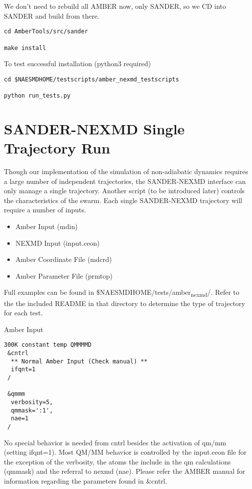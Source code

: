 \documentclass[11pt]{article}
\begin{document}
We don’t need to rebuild all AMBER now, only SANDER, so we CD into SANDER and build from there. 

\begin{verbatim}
cd AmberTools/src/sander 

make install 
\end{verbatim}

To test successful installation (python3 required) 

\begin{verbatim}
cd $NAESMDHOME/testscripts/amber_nexmd_testscripts 

python run_tests.py 
\end{verbatim}

\section{SANDER-NEXMD Single Trajectory Run}
\label{sec:orgb1fd73f}

Though our implementation of the simulation of non-adiabatic dynamics requires a
large number of independent trajectories, the SANDER-NEXMD interface can only
manage a single trajectory. Another script (to be introduced later) controls the
characteristics of the swarm. Each single SANDER-NEXMD trajectory will require a
number of inputs.

\begin{itemize}
\item Amber Input (mdin)

\item NEXMD Input (input.ceon)

\item Amber Coordinate File (mdcrd)

\item Amber Parameter File (prmtop)
\end{itemize}

Full examples can be found in \$NAESMDHOME/tests/amber\textsubscript{nexmd}/. Refer to the the
included README in that directory to determine the type of trajectory for each
test.

Amber Input 

\begin{verbatim}
300K constant temp QMMMMD 
 &cntrl 
  ** Normal Amber Input (Check manual) ** 
  ifqnt=1 
 / 

 &qmmm 
  verbosity=5, 
  qmmask=':1', 
  nae=1 
 / 
\end{verbatim}

No special behavior is needed from cntrl besides the activation of qm/mm (setting ifqnt=1). Most QM/MM behavior is controlled by the input.ceon file for the exception of the verbosity, the atoms the include in the qm calculations (qmmask) and the referral to nexmd (nae). Please refer the AMBER manual for information regarding the parameters found in \&cntrl. 
\end{document}
